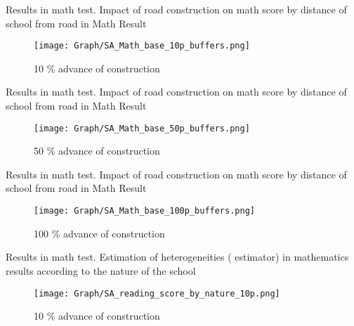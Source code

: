 \documentclass[9pt]{beamer}
\begin{document}




\begin{frame}{ Results in math test.  \hyperlink{result_math}{} }\label{10p_math_buf}
\small Impact of road construction on math score by distance of school from road in Math Result
\begin{figure}
  \centering
  \texttt{[image: Graph/SA\_Math\_base\_10p\_buffers.png]} 
  \caption{\small 10 \% advance of construction}
  \label{fig:6.1sub-first}
\end{figure}

\end{frame}
\begin{frame}{ Results in math test.  \hyperlink{result_math}{} }\label{50p_math_buf}
\small Impact of road construction on math score by distance of school from road in Math Result
\begin{figure}
  \centering
  \texttt{[image: Graph/SA\_Math\_base\_50p\_buffers.png]} 
  \caption{\small 50 \% advance of construction}
  \label{fig:6.1sub-first}
\end{figure}

\end{frame}
\begin{frame}{ Results in math test.   \hyperlink{result_math}{} }\label{100p_math_buf}
\small Impact of road construction on math score by distance of school from road in Math Result
\begin{figure}
  \centering
  \texttt{[image: Graph/SA\_Math\_base\_100p\_buffers.png]} 
  \caption{\small 100 \% advance of construction}
 
\end{figure}

\end{frame}






\begin{frame}{ Results in math test.  \hyperlink{result_math}{} }\label{10p_math_nat}
\small Estimation of heterogeneities (\cite{SUN2021175} estimator) in mathematics results according to the nature of the school  
\begin{figure}
  \centering
  \texttt{[image: Graph/SA\_reading\_score\_by\_nature\_10p.png]} 
  \caption{\small 10 \% advance of construction}
  \label{fig:6.1sub-first}
\end{figure}
\end{frame}
\end{document}
